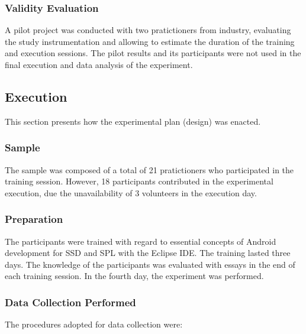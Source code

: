 \subsubsection{Validity Evaluation}

A pilot project was conducted with two pratictioners from industry, evaluating the study instrumentation and allowing to estimate the duration of the training and execution sessions. The pilot results and its participants were not used in the final execution and data analysis of the experiment.

\subsection{Execution}\label{sub:execution}

This section presents how the experimental plan (design) was enacted.

\subsubsection{Sample}

The sample was composed of a total of 21 pratictioners who participated in the training session. However, 18 participants contributed in the experimental execution, due the unavailability of 3 volunteers in the execution day.

\subsubsection{Preparation}

The participants were trained with regard to essential concepts of Android development for SSD and SPL with the Eclipse IDE. The training lasted three days. The knowledge of the participants was evaluated with essays in the end of each training session. In the fourth day, the experiment was performed.

\subsubsection{Data Collection Performed}

The procedures adopted for data collection were:

